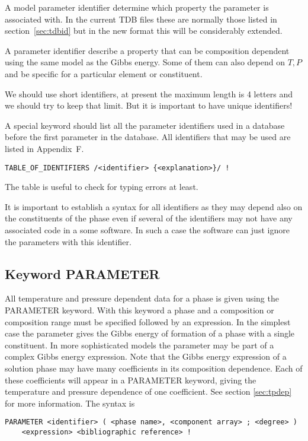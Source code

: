 \documentclass[12pt]{article}
\begin{document}
A model parameter identifier determine which property the parameter is
associated with.  In the current TDB files these are normally those
listed in section~\ref{sec:tdbid} but in the new format this will be
considerably extended.

A parameter identifier describe a property that can be composition
dependent using the same model as the Gibbs energy.  Some of them can
also depend on $T, P$ and be specific for a particular element or
constituent.  

We should use short identifiers, at present the maximum length is 4
letters and we should try to keep that limit.  But it is important to
have unique identifiers!

A special keyword should list all the parameter identifiers used in a
database before the first parameter in the database.  All identifiers
that may be used are listed in Appendix~F.
\begin{verbatim}
TABLE_OF_IDENTIFIERS /<identifier> {<explanation>}/ !
\end{verbatim}

The table is useful to check for typing errors at least.  

It is important to establish a syntax for all identifiers as they may
depend also on the constituents of the phase even if several of the
identifiers may not have any associated code in a some software.  In
such a case the software can just ignore the parameters with this
identifier.

\subsection{Keyword PARAMETER}\label{sec:parameter}

All temperature and pressure dependent data for a phase is given using
the PARAMETER keyword.  With this keyword a phase and a composition or
composition range must be specified followed by an expression.  In the
simplest case the parameter gives the Gibbs energy of formation of a
phase with a single constituent.  In more sophisticated models the
parameter may be part of a complex Gibbs energy expression.  Note that
the Gibbs energy expression of a solution phase may have many
coefficients in its composition dependence.  Each of these
coefficients will appear in a PARAMETER keyword, giving the
temperature and pressure dependence of one coefficient.  See section
\ref{sec:tpdep} for more information.  The syntax is

\begin{verbatim}
PARAMETER <identifier> ( <phase name>, <component array> ; <degree> )
    <expression> <bibliographic reference> !
\end{verbatim}
\end{document}
